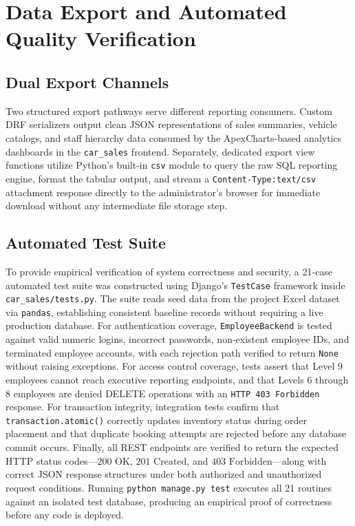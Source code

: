 \section{Data Export and Automated Quality Verification}

\subsection{Dual Export Channels}

Two structured export pathways serve different reporting consumers. Custom DRF serializers output clean JSON representations of sales summaries, vehicle catalogs, and staff hierarchy data consumed by the ApexCharts-based analytics dashboards in the \texttt{car\_sales} frontend. Separately, dedicated export view functions utilize Python's built-in \texttt{csv} module to query the raw SQL reporting engine, format the tabular output, and stream a \texttt{Content-Type:}\allowbreak\texttt{text/csv} attachment response directly to the administrator's browser for immediate download without any intermediate file storage step.

\subsection{Automated Test Suite}

To provide empirical verification of system correctness and security, a 21-case automated test suite was constructed using Django's \texttt{TestCase} framework inside \texttt{car\_sales/tests.py}. The suite reads seed data from the project Excel dataset via \texttt{pandas}, establishing consistent baseline records without requiring a live production database. For authentication coverage, \mbox{\texttt{EmployeeBackend}} is tested against valid numeric logins, incorrect passwords, non-existent employee IDs, and terminated employee accounts, with each rejection path verified to return \texttt{None} without raising exceptions. For access control coverage, tests assert that Level 9 employees cannot reach executive reporting endpoints, and that Levels 6 through 8 employees are denied DELETE operations with an \texttt{HTTP 403 Forbidden} response. For transaction integrity, integration tests confirm that \texttt{transaction.atomic()} correctly updates inventory status during order placement and that duplicate booking attempts are rejected before any database commit occurs. Finally, all REST endpoints are verified to return the expected HTTP status codes---$200\text{ OK}$, $201\text{ Created}$, and $403\text{ Forbidden}$---along with correct JSON response structures under both authorized and unauthorized request conditions. Running \texttt{python manage.py test} executes all 21 routines against an isolated test database, producing an empirical proof of correctness before any code is deployed.
